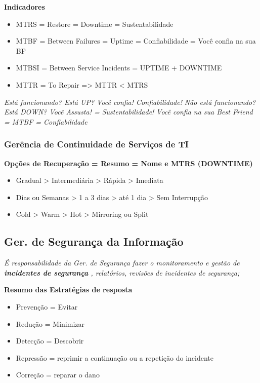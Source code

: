 \textbf{Indicadores}
\begin{itemize}
	\item MTRS = Restore = Downtime = Sustentabilidade
	\item MTBF = Between Failures = Uptime = Confiabilidade = Você confia na sua BF
	\item MTBSI = Between Service Incidents = UPTIME + DOWNTIME
	\item MTTR = To Repair => MTTR < MTRS
\end{itemize}

\begin{center}
	\emph{Está funcionando? Está UP? Você confia! Confiabilidade!}
	\emph{Não está funcionando? Está DOWN? Você Assusta! = Sustentabilidade!}
	\emph{Você confia na sua Best Friend = MTBF = Confiabilidade}
\end{center}

\subsubsection{Gerência de Continuidade de Serviços de TI}

\textbf{Opções de Recuperação = Resumo = Nome e MTRS (DOWNTIME)}
\begin{itemize}
	\item Gradual > Intermediária > Rápida > Imediata
	\item Dias ou Semanas > 1 a 3 dias > até 1 dia > Sem Interrupção
	\item Cold > Warm > Hot > Mirroring ou Split
\end{itemize}

\subsection{Ger. de Segurança da Informação}

	\begin{center}
		\emph{É responsabilidade da Ger. de Segurança fazer o monitoramento e gestão de \textbf{incidentes de segurança} , relatórios, revisões de incidentes de segurança;}
	\end{center}


\textbf{Resumo das Estratégias de resposta}
\begin{itemize}
	\item Prevenção = Evitar
	\item Redução = Minimizar
	\item Detecção = Descobrir
	\item Repressão = reprimir a continuação ou a repetição do incidente
	\item Correção = reparar o dano
\end{itemize}


